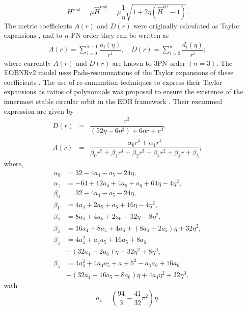 \documentclass[aps,
prd,
amsmath,
amssymb,
twocolumn,
floatfix,
groupedaddress]{revtex4-1}
\newcommand{\Sum}{\displaystyle\sum\limits}
\newcommand{\eff}{\mathrm{eff}}
\newcommand{\real}{\mathrm{real}}
\def\l({\left(}
\def\r){\right)}
\begin{document}
\begin{equation}
H^{\real} = \mu\hat{H}^{\real} = \mu\dfrac{1}{\eta} \sqrt{1 + 2\eta (\hat{H}^{\eff} - 1)}.
\end{equation}
The metric coefficients $A(r)$ and $D(r)$ were originally calculated as Taylor expansions \cite{EOBOriginalBuonannoDamour,PadeAD}, and to $n$-PN order they can be written as
\begin{eqnarray}
A(r) = \Sum^{n+1}_{i=0} \dfrac{a_i (\eta)}{r^i},\quad
D(r) = \Sum^{n}_{i=0} \dfrac{d_i (\eta)}{r^i};
\end{eqnarray}
where currently $A(r)$ and $D(r)$ are known to 3PN order $\l(n=3\r)$.  The EOBNRv2 model uses Pade-resummations of the Taylor expansions of these coefficients \citep{BuonannoEOBv2Main}. The use of re-summation techniques to express their Taylor expansions as ratios of polynomials was proposed to ensure the existence of the innermost stable circular orbit in the EOB framework \citep{PadeAD}. Their resummed expression are given by \citep{BuonannoEOBv2Main}
\begin{eqnarray*}
D(r) &=& \dfrac{r^3}{(52\eta - 6\eta^2) + 6\eta r + r^3},\\
A(r) &=& \dfrac{\alpha_0 r^5 + \alpha_1 r^4}{\beta_0 r^5 + \beta_1 r^4 + \beta_2 r^3 + \beta_3 r^2 + \beta_4 r +\beta_5};
\end{eqnarray*}
where,
\begin{equation}
\begin{split}
\alpha_0 &= 32 - 4a_4 - a_5 - 24\eta ,\\
\alpha_1 &= -64 + 12a_4 + 4a_5 + a_6 + 64\eta - 4\eta^2 ,\\
\beta_0 &= 32 - 4a_4 - a_5 - 24\eta ,\\
\beta_1 &= 4a_4 + 2a_5 + a_6 + 16\eta - 4\eta^2 ,\\
\beta_2 &= 8a_4 + 4a_5 + 2a_6 + 32\eta - 8\eta^2 ,\\
\beta_3 &= 16a_4 + 8a_5 + 4a_6 + \left(8a_4 + 2a_5\right)\eta + 32\eta^2 ,\\
\beta_4 &= 4a_4^2 + a_4a_5 + 16a_5 + 8a_6\\ 
             &+ \left(32a_4 - 2a_6\right)\eta + 32\eta^2 + 8\eta^3 ,\\
\beta_5 &= 4a_4^2 + 4a_4a_5 + a+5^2 - a_4a_6 + 16a_6\\
             &+ \left(32a_4 + 16a_5 - 8a_6\right)\eta + 4a_4\eta^2 + 32\eta^3 ,
\end{split}
\end{equation}
with
\begin{equation}\label{metric_a4}
a_4 = \left(\dfrac{94}{3} - \dfrac{41}{32}\pi^2\right)\eta.
\end{equation}
\end{document}
